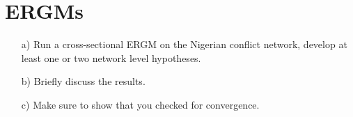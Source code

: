 \documentclass[12pt,letterpaper]{article}
\begin{document}
\section{ERGMs}

\begin{itemize}
	\item[a)] Run a cross-sectional ERGM on the Nigerian conflict network, develop at least one or two network level hypotheses.
	\item[b)] Briefly discuss the results.
	\item [c)] Make sure to show that you checked for convergence.
\end{itemize}

%
%
%
%
%
%
\end{document}
